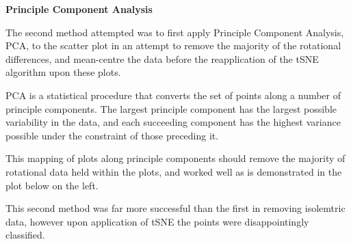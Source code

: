 \documentclass[a4paper,11pt,titlepage]{article}
\begin{document}
 	\textbf{Principle Component Analysis}
	\par
	The second method attempted was to first apply Principle Component Analysis, PCA, to the scatter plot in an attempt to remove the majority of the rotational differences, and mean-centre the data before the reapplication of the tSNE algorithm upon these plots.
	\par 
	PCA is a statistical procedure that converts the set of points along a number of principle components. The largest principle component has the largest possible variability in the data, and each succeeding component has the highest variance possible under the constraint of those preceding it.
	\par 
	This mapping of plots along principle components should remove the majority of rotational data held within the plots, and worked well as is demonstrated in the plot below on the left.
	\par 
	This second method was far more successful than the first in removing isolemtric data, however upon application of tSNE the points were disappointingly classified.
	\\\
		\begin{figure}[H]
    			\centering	
    			\qquad
    			\caption{}%
    			\label{fig:varimax}
	\end{figure}
\end{document}
